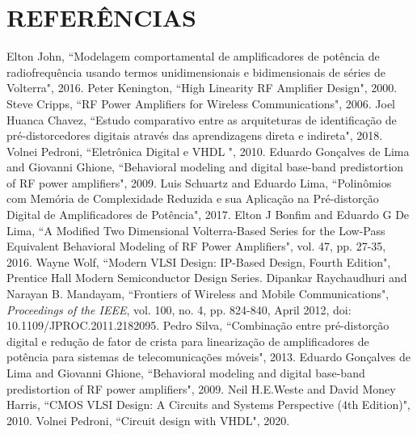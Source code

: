 \documentclass[
	12pt,				%
	openright,			%
	oneside,			%
	a4paper,			%
	brazil				%
	]{abntex2}
\begin{document}
\chapter{REFERÊNCIAS}
\begin{NoTOC} 
\begingroup
\renewcommand{\chapter}[2]{}%

\begin{thebibliography}{9}
	 Elton John, ``Modelagem comportamental de amplificadores de potência de radiofrequência usando termos unidimensionais e bidimensionais de séries de Volterra", 2016.
	 Peter Kenington, ``High Linearity RF Amplifier Design", 2000.
	 Steve Cripps, ``RF Power Amplifiers for Wireless Communications", 2006.
	 Joel Huanca Chavez, ``Estudo comparativo entre as arquiteturas de identificação de pré-distorcedores digitais através das aprendizagens direta e indireta", 2018.
	 Volnei Pedroni, ``Eletrônica Digital e VHDL ", 2010.
	 Eduardo Gonçalves de Lima and Giovanni Ghione, ``Behavioral modeling and digital base-band predistortion of RF power amplifiers", 2009.
	 Luis Schuartz and Eduardo Lima, ``Polinômios com Memória de Complexidade Reduzida e sua Aplicação na Pré-distorção Digital de Amplificadores de Potência", 2017.
	 Elton J Bonfim and Eduardo G De Lima, ``A Modified Two Dimensional Volterra-Based Series for the Low-Pass Equivalent Behavioral Modeling of RF Power Amplifiers", vol. 47, pp. 27-35, 2016.
	 Wayne Wolf, ``Modern VLSI Design: IP-Based Design, Fourth Edition", Prentice Hall Modern Semiconductor Design Series.
	 Dipankar Raychaudhuri and Narayan B. Mandayam, ``Frontiers of Wireless and Mobile Communications", \emph{Proceedings of the IEEE}, vol. 100, no. 4, pp. 824-840, April 2012, doi: 10.1109/JPROC.2011.2182095.
	 Pedro Silva, ``Combinação entre pré-distorção digital e redução de fator de crista para linearização de amplificadores de potência para sistemas de telecomunicações móveis", 2013.
	 Eduardo Gonçalves de Lima and Giovanni Ghione, ``Behavioral modeling and digital base-band predistortion of RF power amplifiers", 2009.
	 Neil H.E.Weste and David Money Harris, ``CMOS VLSI Design: A Circuits and Systems Perspective (4th Edition)", 2010.
	 Volnei Pedroni, ``Circuit design with VHDL", 2020.
\end{thebibliography}
\end{NoTOC}
\endgroup
\end{document}
